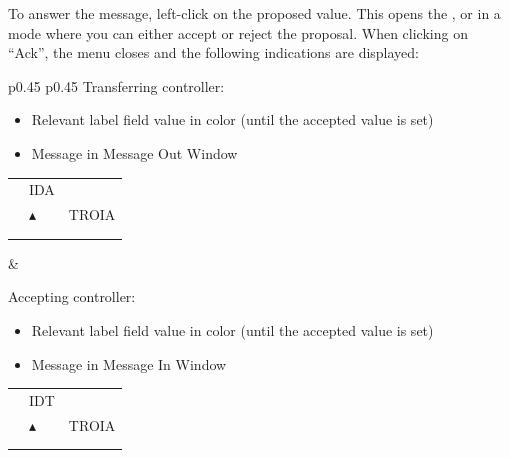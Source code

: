 \documentclass[a4paper,oneside,11pt]{memoir}
\begin{document}
\bigskip

To answer the message, left-click on the proposed value. This opens the ,  or  in a mode where you can either accept or reject the proposal. When clicking on “Ack”, the menu closes and the following indications are displayed:

\begin{longtable}{p{} p{}}
  Transferring controller:

  \begin{itemize}
    \item Relevant label field value in  color (until the accepted value is set)
    \item Message in Message Out Window
  \end{itemize}
  
  \begin{tabular}{
    >{\columncolor{Flight Highlight}}l 
    >{\columncolor{Flight Highlight}}l
    >{\columncolor{Flight Highlight}}l }
    {\color{Assumed} ABC123} & {\color{Coordination} IDA}       & {\color{Assumed} }      \\
    {\color{Assumed} 100}    & {\color{Assumed} $\blacktriangle$} & {\color{Assumed} TROIA} \\
    {\color{Assumed} 180}    & {\color{Assumed} }          & {\color{Assumed} }\\     
    {\color{Reminder} H360}    & {\color{Assumed} }          & {\color{Assumed} }     
  \end{tabular}

  &

  Accepting controller:

  \begin{itemize}
    \item Relevant label field value in  color (until the accepted value is set)
    \item Message in Message In Window
  \end{itemize}
  
  \begin{tabular}{
    >{\columncolor{Flight Highlight}}l 
    >{\columncolor{Flight Highlight}}l
    >{\columncolor{Flight Highlight}}l }
    {\color{Coordination} ABC123} & {\color{Coordination} IDT}       & {\color{Coordination} }      \\
    {\color{Coordination} 100}    & {\color{Coordination} $\blacktriangle$} & {\color{Coordination} TROIA} \\
    {\color{Coordination} 180}    & {\color{Coordination} }          & {\color{Coordination} }  \\   
    {\color{Reminder} H360}    & {\color{Coordination} }          & {\color{Coordination} }  \\   
  \end{tabular} 
\end{longtable}
\end{document}
